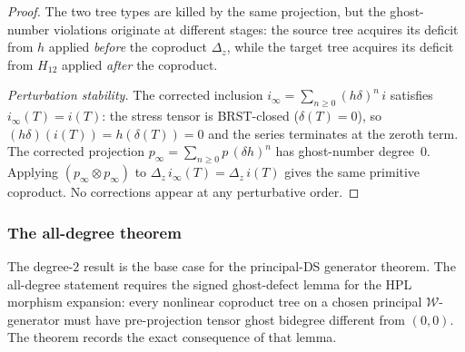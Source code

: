 \begin{proof}
The two tree types are killed by the same
projection, but the ghost-number violations originate at
different stages: the source tree acquires its deficit
from $h$ applied \emph{before} the coproduct $\Delta_z$, while
the target tree acquires its deficit from $H_{12}$ applied
\emph{after} the coproduct.

\emph{Perturbation stability.}
The corrected inclusion $i_\infty = \sum_{n \ge 0}
(h\delta)^n\,i$ satisfies $i_\infty(T) = i(T)$: the stress
tensor is BRST-closed ($\delta(T) = 0$), so
$(h\delta)(i(T)) = h(\delta(T)) = 0$ and the series
terminates at the zeroth term. The corrected projection
$p_\infty = \sum_{n \ge 0} p\,(\delta h)^n$ has
ghost-number degree~$0$. Applying
$(p_\infty \otimes p_\infty)$ to
$\Delta_z\,i_\infty(T) = \Delta_z\,i(T)$ gives the same
primitive coproduct. No corrections appear at any
perturbative order.
\end{proof}

\subsubsection*{The all-degree theorem}

The degree-$2$ result is the base case for the principal-DS
generator theorem. The all-degree statement requires the signed
ghost-defect lemma for the HPL morphism expansion: every nonlinear
coproduct tree on a chosen principal \(\mathcal W\)-generator must have
pre-projection tensor ghost bidegree different from \((0,0)\).
The theorem records the exact consequence of that lemma.

